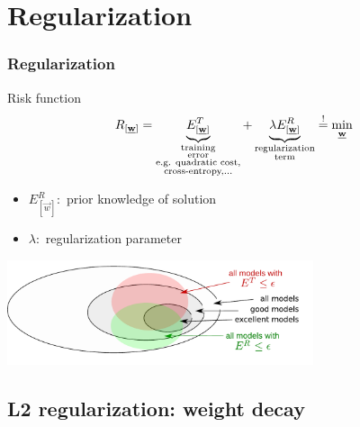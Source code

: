 \section{Regularization}


\begin{frame}\frametitle{Regularization}
	\begin{block}{Risk function}
		\begin{equation*}
			R_{[\underline{\mathbf{w}}]} = \underbrace{ E_{[\underline{\mathbf{w}}]}^T }_{
                    \substack{\text{training} \\ \text{error} \\ \text{e.g. quadratic cost,}\\\text{cross-entropy,...}}}
				+ \underbrace{ \lambda E_{[\underline{\mathbf{w}}]}^R }_{
					\substack{\text{regularization} \\ \text{term}}}
				\stackrel{\mathrm{!}}{=} \min_{\underline{\mathbf{w}}}
		\end{equation*}
		\begin{itemize}
			\item $E^R_{[\vec w]}:$ prior knowledge of solution
			\item $\lambda:$ regularization parameter 
		\end{itemize}
	\end{block}
	
	\begin{center}
		\includegraphics[width=9cm]{img/ModelSelection_models_v2.pdf}
	\end{center}
\end{frame}

\subsection{L2 regularization: weight decay}

